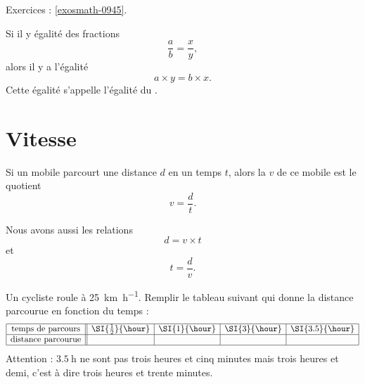 Exercices : \ref{exosmath-0945}.

\begin{propriete}
    Si il y égalité des fractions
    \begin{equation}
        \frac{ a }{ b }=\frac{ x }{ y },
    \end{equation}
    alors il y a l'égalité
    \begin{equation}
        a\times y=b\times x.
    \end{equation}
    Cette égalité s'appelle l'égalité du .
\end{propriete}

\section{Vitesse}

\begin{definition}
    Si un mobile parcourt une distance $d$ en un temps $t$, alors la  $v$ de ce mobile est le quotient
    \begin{equation}
        v=\frac{ d }{ t }.
    \end{equation}
\end{definition}

\begin{Aretenir}
    Nous avons aussi les relations
    \begin{equation}
        d=v\times t
    \end{equation}
    et
    \begin{equation}
        t=\frac{ d }{ v }.
    \end{equation}
\end{Aretenir}

\begin{example}
    Un cycliste roule à \SI{25}{\kilo\meter\per\hour}. Remplir le tableau suivant qui donne la distance parcourue en fonction du temps :
    \begin{equation*}
        \begin{array}[]{|c||c|c|c|c|}
            \hline
            \text{temps de parcours}&\SI{\frac{ 1 }{2}}{\hour}&\SI{1}{\hour}&\SI{3}{\hour}&\SI{3.5}{\hour}\\
            \hline
            \text{distance parcourue}&&&&\\
            \hline
        \end{array}
    \end{equation*}
    Attention : \( \SI{3.5}{\hour}\) ne sont pas trois heures et cinq minutes mais trois heures et demi, c'est à dire trois heures et trente minutes.
\end{example}

